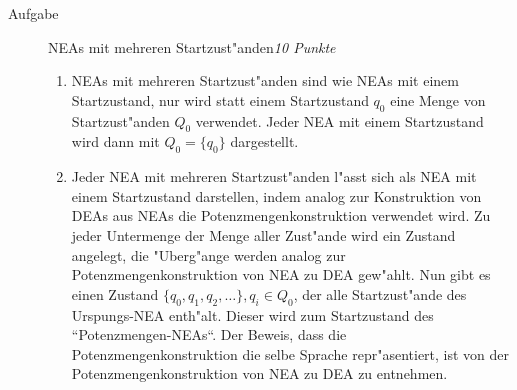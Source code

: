 \documentclass[a4paper,twoside,12pt,fleqn]{article}
\newcounter{AUFGNR}
\newcommand{\AUFGABE}[2]{\vspace{0.3cm}\item[Aufgabe~\arabic{AUFGNR}]\stepcounter{AUFGNR} #1\hfill\emph{#2}}
\begin{document}
\begin{description}
	\AUFGABE{NEAs mit mehreren Startzust"anden}{10 Punkte}
	\begin{enumerate}
		\item NEAs mit mehreren Startzust"anden sind wie NEAs mit einem
		Startzustand, nur wird statt einem Startzustand $q_0$ eine
		Menge von Startzust"anden $Q_0$ verwendet. Jeder NEA mit
		einem Startzustand wird dann mit $Q_0 = \{q_0\}$ dargestellt.
		\item Jeder NEA mit mehreren Startzust"anden l"asst sich als
		NEA mit einem Startzustand darstellen, indem analog zur
		Konstruktion von DEAs aus NEAs die Potenzmengenkonstruktion
		verwendet wird. Zu jeder Untermenge der Menge aller Zust"ande
		wird ein Zustand angelegt, die "Uberg"ange werden analog zur
		Potenzmengenkonstruktion von NEA zu DEA gew"ahlt.
		Nun gibt es einen Zustand $\{q_0, q_1, q_2, \dots\}, q_i \in Q_0$,
		der alle Startzust"ande des Urspungs-NEA enth"alt. Dieser wird
		zum Startzustand des ``Potenzmengen-NEAs``. Der Beweis, dass
		die Potenzmengenkonstruktion die selbe Sprache repr"asentiert,
		ist von der Potenzmengenkonstruktion von NEA zu DEA zu entnehmen.
	\end{enumerate}
\end{description}
\end{document}
